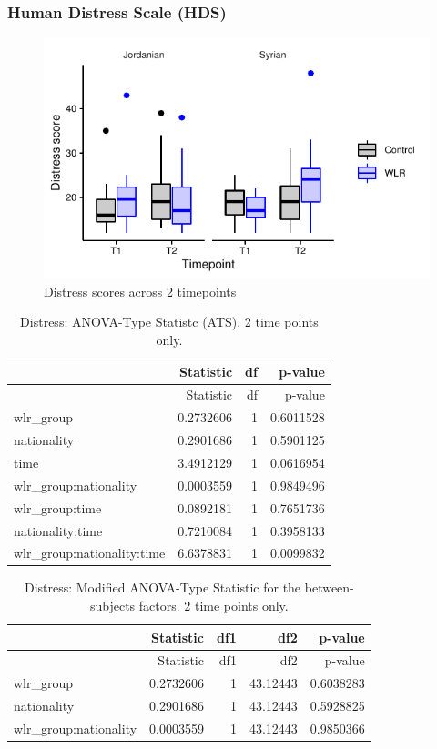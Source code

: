 \documentclass[]{article}
\begin{document}
\newpage

\hypertarget{human-distress-scale-hds-1}{%
\subsubsection{Human Distress Scale
(HDS)}\label{human-distress-scale-hds-1}}

\begin{figure}[H]

{\centering \includegraphics{WLR-analyses-report_files/figure-latex/unnamed-chunk-34-1} 

}

\caption{Distress scores across 2 timepoints}\label{fig:unnamed-chunk-34}
\end{figure}

\begin{longtable}[]{@{}lrrr@{}}
\caption{Distress: ANOVA-Type Statistc (ATS). 2 time points
only.}\tabularnewline
\toprule
& Statistic & df & p-value\tabularnewline
\midrule
\endfirsthead
\toprule
& Statistic & df & p-value\tabularnewline
\midrule
\endhead
wlr\_group & 0.2732606 & 1 & 0.6011528\tabularnewline
nationality & 0.2901686 & 1 & 0.5901125\tabularnewline
time & 3.4912129 & 1 & 0.0616954\tabularnewline
wlr\_group:nationality & 0.0003559 & 1 & 0.9849496\tabularnewline
wlr\_group:time & 0.0892181 & 1 & 0.7651736\tabularnewline
nationality:time & 0.7210084 & 1 & 0.3958133\tabularnewline
wlr\_group:nationality:time & 6.6378831 & 1 & 0.0099832\tabularnewline
\bottomrule
\end{longtable}

\begin{longtable}[]{@{}lrrrr@{}}
\caption{Distress: Modified ANOVA-Type Statistic for the
between-subjects factors. 2 time points only.}\tabularnewline
\toprule
& Statistic & df1 & df2 & p-value\tabularnewline
\midrule
\endfirsthead
\toprule
& Statistic & df1 & df2 & p-value\tabularnewline
\midrule
\endhead
wlr\_group & 0.2732606 & 1 & 43.12443 & 0.6038283\tabularnewline
nationality & 0.2901686 & 1 & 43.12443 & 0.5928825\tabularnewline
wlr\_group:nationality & 0.0003559 & 1 & 43.12443 &
0.9850366\tabularnewline
\bottomrule
\end{longtable}
\end{document}
